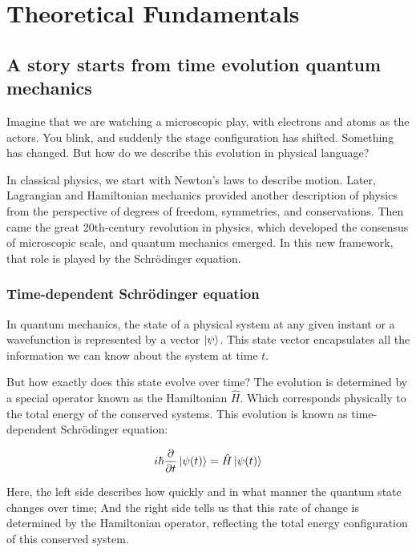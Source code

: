 \chapter{Theoretical Fundamentals\label{cha:fundamentals}}

\section{A story starts from time evolution quantum mechanics}

Imagine that we are watching a microscopic play, with electrons and atoms as the actors. You blink, and suddenly the stage configuration has shifted. Something has changed. But how do we describe this evolution in physical language?

In classical physics, we start with Newton’s laws to describe motion. Later, Lagrangian and Hamiltonian mechanics provided another description of physics from the perspective of degrees of freedom, symmetries, and conservations. Then came the great 20th-century revolution in physics, which developed the consensus of microscopic scale, and quantum mechanics emerged. In this new framework, that role is played by the Schrödinger equation.

\subsection{Time-dependent Schrödinger equation}

In quantum mechanics, the state of a physical system at any given instant or a wavefunction is represented by a vector $\ket{\psi}$. This state vector encapsulates all the information we can know about the system at time $t$.

But how exactly does this state evolve over time? The evolution is determined by a special operator known as the Hamiltonian $\hat{H}$. Which corresponds physically to the total energy of the conserved systems. This evolution is known as time-dependent Schrödinger equation:

\begin{equation}
    i\hbar\frac{\partial}{\partial t}\ket{\psi(t)}=\hat{H}\ket{\psi(t)}
    \label{tdse}
\end{equation}

Here, the left side describes how quickly and in what manner the quantum state changes over time; And the right side tells us that this rate of change is determined by the Hamiltonian operator, reflecting the total energy configuration of this conserved system. 

